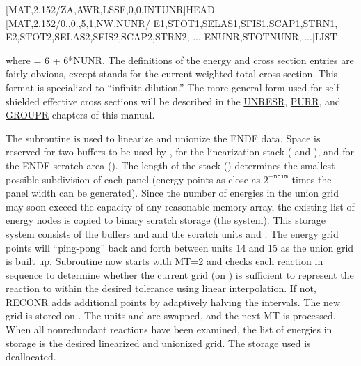 \small
\begin{ccode}

    [MAT,2,152/ZA,AWR,LSSF,0,0,INTUNR]HEAD
    [MAT,2,152/0.,0.,5,1,NW,NUNR/
               E1,STOT1,SELAS1,SFIS1,SCAP1,STRN1,
               E2,STOT2,SELAS2,SFIS2,SCAP2,STRN2,
               ...
               ENUNR,STOTNUNR,....]LIST

\end{ccode}
\normalsize

\noindent
where  = 6 + 6*NUNR.  The definitions of the energy
and cross section entries are fairly obvious, except
 stands for the current-weighted total cross
section.  This format is specialized to ``infinite
dilution.''  The more general form used for self-shielded
effective cross sections will be described in the
\hyperlink{sUNRESRhy}{UNRESR},
\hyperlink{sPURRhy}{PURR}, and
\hyperlink{sGROUPRhy}{GROUPR}
chapters of this manual.

The subroutine  is
used to linearize and unionize the ENDF data.  Space is reserved
for two buffers to be used by , for the
linearization stack ( and ), and for the
ENDF scratch area ().  The length of the stack ()
determines the smallest possible subdivision of each panel
(energy points as close as $2^{-{\mathtt{ndim}}}$ times the panel
width can be generated).  Since the number of energies in the
union grid may soon exceed the capacity of any reasonable memory
array, the existing list of energy nodes is copied to binary
scratch storage (the  system).  This storage system
consists of the buffers  and  and the
scratch units  and .  The energy grid
points will ``ping-pong'' back and forth between units 14 and 15
as the union grid is built up.  Subroutine  now
starts with MT=2 and checks each reaction in sequence to
determine whether the current grid (on ) is
sufficient to represent the reaction to within the desired
tolerance using linear interpolation.  If not, RECONR adds
additional points by adaptively halving the intervals.  The
new grid is stored on .  The units  and
 are swapped, and the next MT is processed.  When all
nonredundant reactions have been examined, the list of energies
in  storage is the desired linearized and
unionized grid.  The storage used is deallocated.

